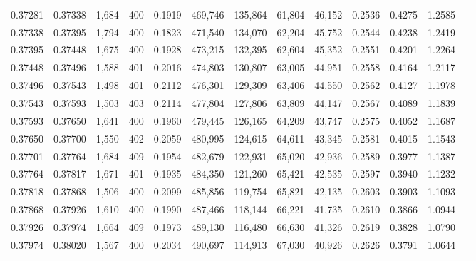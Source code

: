 \begin{tabular}{rrrrrrrrrrrrr}
0.37281 & 0.37338 &  1,684 & 400 &                                     0.1919 & 469,746 & 135,864 &  61,804 &  46,152 & 0.2536 & 0.4275 & 1.2585 \\
0.37338 & 0.37395 &  1,794 & 400 &                                     0.1823 & 471,540 & 134,070 &  62,204 &  45,752 & 0.2544 & 0.4238 & 1.2419 \\
0.37395 & 0.37448 &  1,675 & 400 &                                     0.1928 & 473,215 & 132,395 &  62,604 &  45,352 & 0.2551 & 0.4201 & 1.2264 \\
0.37448 & 0.37496 &  1,588 & 401 &                                     0.2016 & 474,803 & 130,807 &  63,005 &  44,951 & 0.2558 & 0.4164 & 1.2117 \\
0.37496 & 0.37543 &  1,498 & 401 &                                     0.2112 & 476,301 & 129,309 &  63,406 &  44,550 & 0.2562 & 0.4127 & 1.1978 \\
0.37543 & 0.37593 &  1,503 & 403 &                                     0.2114 & 477,804 & 127,806 &  63,809 &  44,147 & 0.2567 & 0.4089 & 1.1839 \\
0.37593 & 0.37650 &  1,641 & 400 &                                     0.1960 & 479,445 & 126,165 &  64,209 &  43,747 & 0.2575 & 0.4052 & 1.1687 \\
0.37650 & 0.37700 &  1,550 & 402 &                                     0.2059 & 480,995 & 124,615 &  64,611 &  43,345 & 0.2581 & 0.4015 & 1.1543 \\
0.37701 & 0.37764 &  1,684 & 409 &                                     0.1954 & 482,679 & 122,931 &  65,020 &  42,936 & 0.2589 & 0.3977 & 1.1387 \\
0.37764 & 0.37817 &  1,671 & 401 &                                     0.1935 & 484,350 & 121,260 &  65,421 &  42,535 & 0.2597 & 0.3940 & 1.1232 \\
0.37818 & 0.37868 &  1,506 & 400 &                                     0.2099 & 485,856 & 119,754 &  65,821 &  42,135 & 0.2603 & 0.3903 & 1.1093 \\
0.37868 & 0.37926 &  1,610 & 400 &                                     0.1990 & 487,466 & 118,144 &  66,221 &  41,735 & 0.2610 & 0.3866 & 1.0944 \\
0.37926 & 0.37974 &  1,664 & 409 &                                     0.1973 & 489,130 & 116,480 &  66,630 &  41,326 & 0.2619 & 0.3828 & 1.0790 \\
0.37974 & 0.38020 &  1,567 & 400 &                                     0.2034 & 490,697 & 114,913 &  67,030 &  40,926 & 0.2626 & 0.3791 & 1.0644 \\

\end{tabular}
